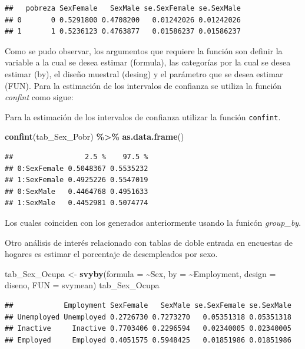 \documentclass[
  spanish,
  12pt,
]{book}
\newenvironment{Shaded}{\begin{snugshade}}{\end{snugshade}}
\newcommand{\AttributeTok}[1]{\textcolor[rgb]{0.13,0.29,0.53}{#1}}
\newcommand{\FunctionTok}[1]{\textcolor[rgb]{0.13,0.29,0.53}{\textbf{#1}}}
\newcommand{\NormalTok}[1]{#1}
\newcommand{\OtherTok}[1]{\textcolor[rgb]{0.56,0.35,0.01}{#1}}
\newcommand{\SpecialCharTok}[1]{\textcolor[rgb]{0.81,0.36,0.00}{\textbf{#1}}}
\begin{document}
\begin{verbatim}
##   pobreza SexFemale   SexMale se.SexFemale se.SexMale
## 0       0 0.5291800 0.4708200   0.01242026 0.01242026
## 1       1 0.5236123 0.4763877   0.01586237 0.01586237
\end{verbatim}

Como se pudo observar, los argumentos que requiere la función son definir la variable a la cual se desea estimar (formula), las categorías por la cual se desea estimar (by), el diseño muestral (desing) y el parámetro que se desea estimar (FUN). Para la estimación de los intervalos de confianza se utiliza la función \emph{confint} como sigue:

Para la estimación de los intervalos de confianza utilizar la función \texttt{confint}.

\begin{Shaded}
\begin{Highlighting}[]
\FunctionTok{confint}\NormalTok{(tab\_Sex\_Pobr) }\SpecialCharTok{\%\textgreater{}\%} \FunctionTok{as.data.frame}\NormalTok{()}
\end{Highlighting}
\end{Shaded}

\begin{verbatim}
##                 2.5 %    97.5 %
## 0:SexFemale 0.5048367 0.5535232
## 1:SexFemale 0.4925226 0.5547019
## 0:SexMale   0.4464768 0.4951633
## 1:SexMale   0.4452981 0.5074774
\end{verbatim}

Los cuales coinciden con los generados anteriormente usando la funicón \emph{group\_by}.

Otro análisis de interés relacionado con tablas de doble entrada en encuestas de hogares es estimar el porcentaje de desempleados por sexo.

\begin{Shaded}
\begin{Highlighting}[]
\NormalTok{tab\_Sex\_Ocupa }\OtherTok{\textless{}{-}} \FunctionTok{svyby}\NormalTok{(}\AttributeTok{formula =} \SpecialCharTok{\textasciitilde{}}\NormalTok{Sex,  }\AttributeTok{by =} \SpecialCharTok{\textasciitilde{}}\NormalTok{Employment,}
                       \AttributeTok{design =}\NormalTok{ diseno, }\AttributeTok{FUN =}\NormalTok{ svymean)}
\NormalTok{tab\_Sex\_Ocupa}
\end{Highlighting}
\end{Shaded}

\begin{verbatim}
##            Employment SexFemale   SexMale se.SexFemale se.SexMale
## Unemployed Unemployed 0.2726730 0.7273270   0.05351318 0.05351318
## Inactive     Inactive 0.7703406 0.2296594   0.02340005 0.02340005
## Employed     Employed 0.4051575 0.5948425   0.01851986 0.01851986
\end{verbatim}
\end{document}
